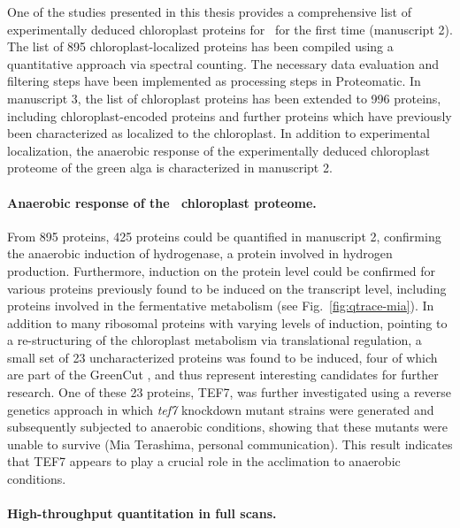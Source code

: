 One of the studies presented in this thesis provides a comprehensive list of 
experimentally deduced chloroplast proteins for \cre~for the first time
(manuscript 2).
The list of 895 chloroplast-localized proteins has been compiled using
a quantitative approach via spectral counting.
The necessary data evaluation and filtering steps have been implemented
as processing steps in Proteomatic.
In manuscript 3, the list of chloroplast proteins has been extended 
to 996 proteins, including chloroplast-encoded proteins and further proteins
which have previously been characterized as localized to the chloroplast.
In addition to experimental localization, the anaerobic response of the 
experimentally deduced chloroplast proteome of the green alga is characterized 
in manuscript 2. 

\paragraph{Anaerobic response of the \cre~chloroplast proteome.}

From 895 proteins, 425 proteins could be quantified in manuscript 2, 
confirming the anaerobic induction of hydrogenase, a protein involved in 
hydrogen production.
Furthermore, induction on the protein level could be confirmed for various 
proteins previously found to be induced on the transcript level,
including proteins involved in the fermentative metabolism 
(see Fig.~\ref{fig:qtrace-mia}).
In addition to many ribosomal proteins with varying levels of induction,
pointing to a re-structuring of the chloroplast metabolism via translational 
regulation, a small set of 23 uncharacterized proteins was found to be induced,
four of which are part of the GreenCut \citep{Grossman2010}, and thus represent 
interesting candidates for further research.
One of these 23 proteins, TEF7, was further investigated using a reverse 
genetics approach in which {\em tef7} knockdown mutant strains were generated
and subsequently subjected to anaerobic conditions, showing that these mutants 
were unable to survive (Mia Terashima, personal communication).
This result indicates that TEF7 appears to play a crucial role in the 
acclimation to anaerobic conditions.

\paragraph{High-throughput quantitation in full scans.}

